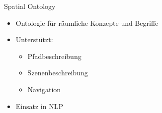 \documentclass[12pt,a4paper]{beamer}
\begin{document}


\begin{frame}{Spatial Ontology}
\begin{itemize}
\item Ontologie für räumliche Konzepte und Begriffe
\item Unterstützt:
\begin{itemize}
    \item Pfadbeschreibung
    \item Szenenbeschreibung
    \item Navigation
\end{itemize}
\item Einsatz in NLP
\end{itemize}
\end{frame}


\end{document}
